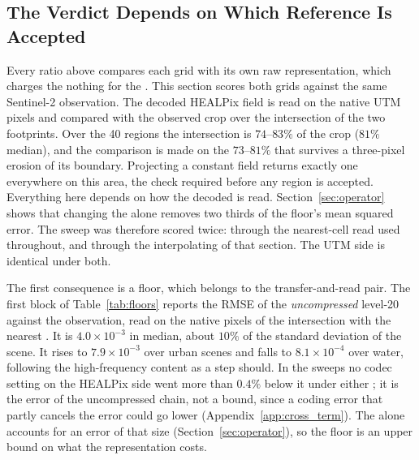 \subsection{The Verdict Depends on Which Reference Is Accepted}
\label{sec:common_reference}

Every ratio above compares each grid with its own raw representation,
which charges the  nothing for the . This section scores
both grids against the same Sentinel-2 observation. The decoded HEALPix
field is read on the native UTM pixels and compared with the observed
crop over the intersection of the two footprints. Over the 40 regions
the intersection is $74$--$83\%$ of the crop ($81\%$ median), and the
comparison is made on the $73$--$81\%$ that survives a three-pixel
erosion of its boundary. Projecting a constant field returns exactly one
everywhere on this area, the check required before any region is
accepted. Everything here depends on how the decoded  is read.
Section~\ref{sec:operator} shows that changing the  alone removes
two thirds of the floor's mean squared error. The sweep was therefore
scored twice: through the nearest-cell read used throughout,
and through the interpolating  of that section. The UTM side is
identical under both.

The first consequence is a floor, which belongs to the transfer-and-read
pair. The first block of Table~\ref{tab:floors} reports the RMSE of the
\emph{uncompressed} level-20  against the observation, read on
the native pixels of the intersection with the nearest . It is
$4.0\times10^{-3}$ in median, about $10\%$ of the standard deviation of
the scene. It rises to $7.9\times10^{-3}$ over urban scenes and falls to
$8.1\times10^{-4}$ over water, following the high-frequency content as a
 step should. In the sweeps no codec setting on the HEALPix side
went more than $0.4\%$ below it under either ; it is the
error of the uncompressed chain, not a bound, since a coding error that
partly cancels the  error could go lower
(Appendix~\ref{app:cross_term}). The  alone accounts for an error of that size
(Section~\ref{sec:operator}), so the floor is an upper bound on what
the representation costs.



